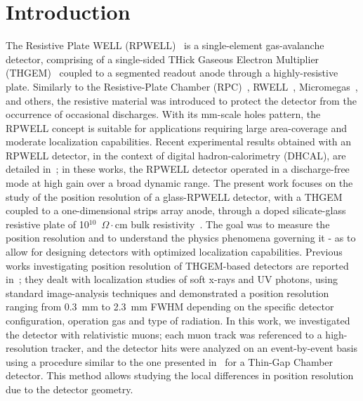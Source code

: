 \section{Introduction}
\label{sec: Introduction}
The Resistive Plate WELL (RPWELL)~\cite{rubin2013first} is a single-element gas-avalanche detector, comprising of a single-sided THick Gaseous Electron Multiplier (THGEM)~\cite{chechik2004thick,breskin2009concise} coupled to a segmented readout anode through a highly-resistive plate. Similarly to the Resistive-Plate Chamber (RPC)~\cite{santonico1981development}, RWELL~\cite{arazi2014laboratory}, Micromegas~\cite{alexopoulos2011spark}, and others, the resistive material was introduced to protect the detector from the occurrence of occasional discharges. With its mm-scale holes pattern, the RPWELL concept is suitable for applications requiring large area-coverage and moderate localization capabilities. Recent experimental results obtained with an RPWELL detector, in the context of digital hadron-calorimetry (DHCAL), are detailed in~\cite{bressler2016first,moleri2016resistive,moleri2016beam}; in these works, the RPWELL detector operated in a discharge-free mode at high gain over a broad dynamic range.  
The present work focuses on the study of the position resolution of a glass-RPWELL detector, with a THGEM coupled to a one-dimensional strips array anode, through a doped silicate-glass resistive plate of 10$^{10}$~$\Omega\cdot$cm bulk resistivity~\cite{wang2010development}.  The goal was to measure the position resolution and to understand the physics phenomena governing it - as to allow for designing detectors with optimized localization capabilities. Previous works investigating position resolution of THGEM-based detectors are reported in~\cite{cortesi2007investigations,cortesi2009thgem,silva2013x,lopes2013position}; they dealt with localization studies of soft x-rays and UV photons, using standard image-analysis techniques and demonstrated a position resolution ranging from 0.3~mm to 2.3~mm FWHM depending on the specific detector configuration, operation gas and type of radiation.  In this work, we investigated the detector with relativistic muons; each muon track was referenced to a high-resolution tracker, and the detector hits were analyzed on an event-by-event basis using a procedure similar to the one presented in~\cite{abusleme2016performance} for a Thin-Gap Chamber detector. This method allows studying the local differences in position resolution due to the detector geometry. 
